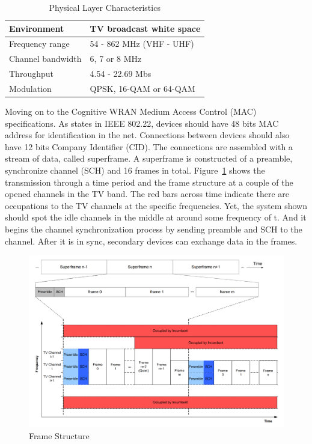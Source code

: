 \begin{table}[ht]
\centering
\setlength{\tabcolsep}{20pt}
\renewcommand{\arraystretch}{1.5}
\begin{tabular}{| l | l |}
\hline
\hspace{0.3cm}  Environment & TV broadcast white space \\ 
\hline
\hspace{0.3cm}  Frequency range &  54 - 862 MHz  (VHF - UHF)\\ 
\hline
\hspace{0.3cm}  Channel bandwidth &  6, 7 or 8 MHz \\ 
\hline
\hspace{0.3cm}  Throughput &  4.54 - 22.69 Mbs  \\ 
\hline
\hspace{0.3cm}  Modulation &  QPSK, 16-QAM or 64-QAM  \\ \hline
\hline
\end{tabular}
\caption{Physical Layer Characteristics}
\label{tab:physical}
\end{table}

Moving on to the Cognitive WRAN Medium Access Control (MAC) specifications. As states in IEEE 802.22, devices should have 48
bits MAC address for identification in the net. Connections between devices should also have 12 bits Company Identifier (CID). The 
connections are assembled with a stream of data, called superframe. A superframe is constructed of a preamble, synchronize channel (SCH) and 16 frames
in total. Figure~\ref{fig:frame} shows the transmission through a time period and the frame structure at a couple of the opened channels in the TV band. The red bars across time indicate there are occupations to the TV channels at the specific frequencies. Yet, the system shown should spot the idle channels in the middle at around some frequency of t. And it begins the channel synchronization process by sending preamble and SCH to the channel. After it is in sync, secondary devices can exchange data in the frames. 

\begin{figure}[ht]
\centering
\includegraphics[width=12cm]{figures/frame.png}
\caption{Frame Structure \cite{ieee_802_22}}
\label{fig:frame}
\end{figure}


